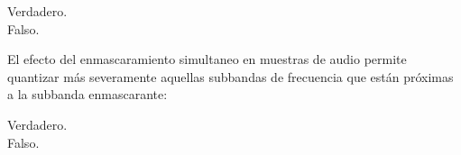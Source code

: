 \documentclass[legalpaper, 12pt, addpoints]{exam}
\begin{document}
\begin{questions}
\begin{oneparchoices}
  \choice Verdadero.\\
  \choice Falso.
\end{oneparchoices}

\vspace{0.10in}

\question El efecto del enmascaramiento simultaneo en muestras de audio permite quantizar más severamente aquellas subbandas de frecuencia que están próximas a la subbanda enmascarante:

\begin{oneparchoices}
  \choice Verdadero.\\
  \choice Falso.
\end{oneparchoices}

\vspace{0.10in}

\vspace{0.25in} {}

\end{questions}
\end{document}
